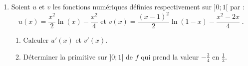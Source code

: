 \begin{enumerate}
                  (On prend $\ln (2) \simeq 0,7$)
            \item Soient $u$ et $v$ les fonctions num\'eriques d\'efinies respectivement sur $]0;1[$ par : 
                  \[
                        u(x) = \frac{x^2}{2} \ln (x) - \frac{x^2}{4}
                        \text{ et }
                        v(x) = \frac{(x-1)^2}{2} \ln (1-x) - \frac{x^2 - 2x}{4} \;.
                  \]
                  \begin{enumerate}
                        \item Calculer $u'(x)$ et $v'(x)$.
                        \item D\'eterminer la primitive sur $]0;1[$ de $f$ qui prend la valeur $-\frac{3}{4}$ en $\frac{1}{2}$.
                  \end{enumerate}
      \end{enumerate}












